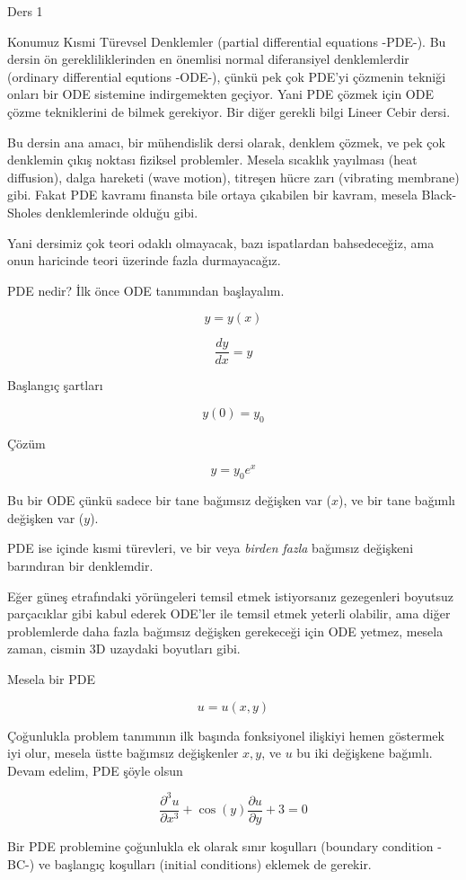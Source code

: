 \documentclass[12pt,fleqn]{article}\usepackage{../../common}
\begin{document}
Ders 1

Konumuz Kısmi Türevsel Denklemler (partial differential equations -PDE-). Bu
dersin ön gerekliliklerinden en önemlisi normal diferansiyel denklemlerdir
(ordinary differential equtions -ODE-), çünkü pek çok PDE'yi çözmenin
tekniği onları bir ODE sistemine indirgemekten geçiyor. Yani PDE çözmek
için ODE çözme tekniklerini de bilmek gerekiyor. Bir diğer gerekli bilgi
Lineer Cebir dersi.

Bu dersin ana amacı, bir mühendislik dersi olarak, denklem çözmek, ve pek
çok denklemin çıkış noktası fiziksel problemler. Mesela sıcaklık yayılması
(heat diffusion), dalga hareketi (wave motion), titreşen hücre zarı
(vibrating membrane) gibi. Fakat PDE kavramı finansta bile ortaya çıkabilen
bir kavram, mesela Black-Sholes denklemlerinde olduğu gibi. 

Yani dersimiz çok teori odaklı olmayacak, bazı ispatlardan bahsedeceğiz,
ama onun haricinde teori üzerinde fazla durmayacağız. 

PDE nedir? İlk önce ODE tanımından başlayalım. 

$$ y = y(x) $$

$$ \frac{dy}{dx} = y $$

Başlangıç şartları

$$ y(0) = y_0 $$

Çözüm 

$$ y = y_0e^x $$

Bu bir ODE çünkü sadece bir tane bağımsız değişken var ($x$), ve bir tane
bağımlı değişken var ($y$). 

PDE ise içinde kısmi türevleri, ve bir veya {\em birden fazla} bağımsız
değişkeni barındıran bir denklemdir.

Eğer güneş etrafındaki yörüngeleri temsil etmek istiyorsanız gezegenleri
boyutsuz parçacıklar gibi kabul ederek ODE'ler ile temsil etmek yeterli
olabilir, ama diğer problemlerde daha fazla bağımsız değişken gerekeceği
için ODE yetmez, mesela zaman, cismin 3D uzaydaki boyutları gibi.

Mesela bir PDE

$$ u = u(x,y) $$

Çoğunlukla problem tanımının ilk başında fonksiyonel ilişkiyi hemen
göstermek iyi olur, mesela üstte bağımsız değişkenler $x,y$, ve $u$ bu iki
değişkene bağımlı. Devam edelim, PDE şöyle olsun

$$ \frac{\partial^3 u}{\partial x^3} + 
\cos(y)\frac{\partial u}{\partial y} + 3 = 0
$$

Bir PDE problemine çoğunlukla ek olarak sınır koşulları (boundary condition
-BC-) ve başlangıç koşulları (initial conditions) eklemek de gerekir.
\end{document}
